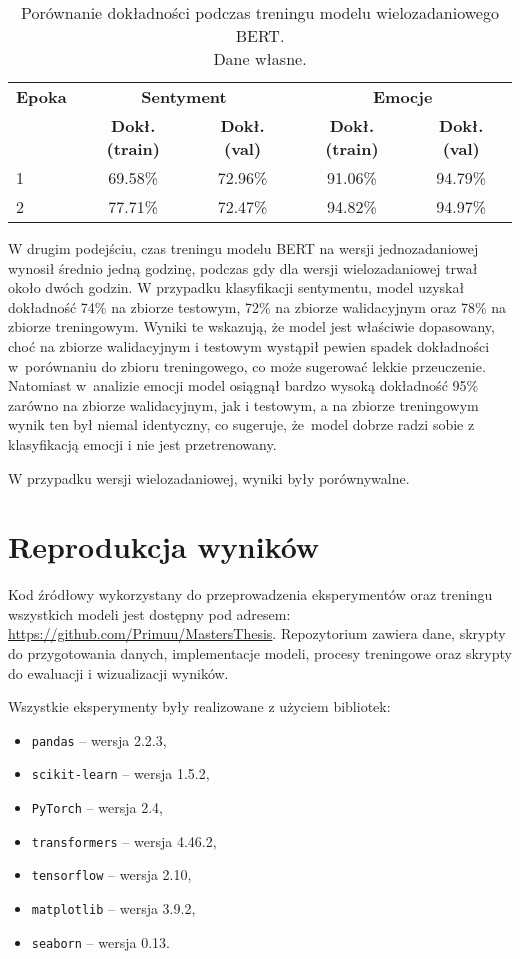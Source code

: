 \begin{table}[H]
\centering
\label{tab:bert_multi_2_training_process}
\begin{tabular}{|l|c|c|c|c|}
\hline
\textbf{Epoka} & \multicolumn{2}{c|}{\textbf{Sentyment}} & \multicolumn{2}{c|}{\textbf{Emocje}} \\
\cline{2-5}
& \textbf{Dokł. (train)} & \textbf{Dokł. (val)} & \textbf{Dokł. (train)} & \textbf{Dokł. (val)} \\
\hline
1 & 69.58\% & 72.96\% & 91.06\% & 94.79\% \\
2 & 77.71\% & 72.47\% & 94.82\% & 94.97\% \\
\hline
\end{tabular}
\caption{Porównanie dokładności podczas treningu modelu wielozadaniowego BERT.\\Dane własne.}
\end{table}

W drugim podejściu, czas treningu modelu BERT na wersji jednozadaniowej wynosił średnio jedną godzinę, podczas gdy dla wersji wielozadaniowej trwał około dwóch godzin. W przypadku klasyfikacji sentymentu, model uzyskał dokładność 74\% na zbiorze testowym, 72\% na zbiorze walidacyjnym oraz 78\% na zbiorze treningowym. Wyniki te wskazują, że model jest właściwie dopasowany, choć na zbiorze walidacyjnym i testowym wystąpił pewien spadek dokładności w~porównaniu do zbioru treningowego, co może sugerować lekkie przeuczenie. Natomiast w~analizie emocji model osiągnął bardzo wysoką dokładność 95\% zarówno na zbiorze walidacyjnym, jak i testowym, a na zbiorze treningowym wynik ten był niemal identyczny, co sugeruje, że~model dobrze radzi sobie z klasyfikacją emocji i nie jest przetrenowany.

W przypadku wersji wielozadaniowej, wyniki były porównywalne.

\section{Reprodukcja wyników}
Kod źródłowy wykorzystany do przeprowadzenia eksperymentów oraz treningu wszystkich modeli jest dostępny pod adresem: \url{https://github.com/Primuu/MastersThesis}. Repozytorium zawiera dane, skrypty do przygotowania danych, implementacje modeli, procesy treningowe oraz skrypty do ewaluacji i wizualizacji wyników.

Wszystkie eksperymenty były realizowane z użyciem bibliotek:
\begin{itemize}
    \item \texttt{pandas} -- wersja 2.2.3,
    \item \texttt{scikit-learn} -- wersja 1.5.2,
    \item \texttt{PyTorch} -- wersja 2.4,
    \item \texttt{transformers} -- wersja 4.46.2,
    \item \texttt{tensorflow} -- wersja 2.10,
    \item \texttt{matplotlib} -- wersja 3.9.2,
    \item \texttt{seaborn} -- wersja 0.13.
\end{itemize}

